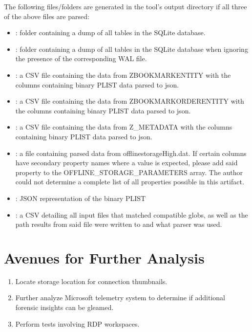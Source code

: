 \documentclass[journal]{IEEEtran}
\begin{document}
The following files/folders are generated in the tool’s output directory if all three of the above files are parsed:
\begin{itemize}
	\item {}: folder containing a dump of all tables in the SQLite database.
	\item {}: folder containing a dump of all tables in the SQLite database when ignoring the presence of the corresponding WAL file.
	\item {}: a CSV file containing the data from ZBOOKMARKENTITY with the columns containing binary PLIST data parsed to json.
	\item {}:  a CSV file containing the data from ZBOOKMARKORDERENTITY with the columns containing binary PLIST data parsed to json.
	\item {}:  a CSV file containing the data from Z\_METADATA with the columns containing binary PLIST data parsed to json.
	\item {}: a file containing parsed data from offlinestorageHigh.dat. If certain columns have secondary property names where a value is expected, please add said property to the OFFLINE\_STORAGE\_PARAMETERS array. The author could not determine a complete list of all properties possible in this artifact.
	\item {}: JSON representation of the binary PLIST 
	\item {}: a CSV detailing all input files that matched compatible globs, as well as the path results from said file were written to and what parser was used.
\end{itemize}

\section{Avenues for Further Analysis}

\begin{enumerate}
	\item Locate storage location for connection thumbnails.
	\item Further analyze Microsoft telemetry system to determine if additional forensic insights can be gleamed.
	\item Perform tests involving RDP workspaces.
\end{enumerate}
\end{document}
